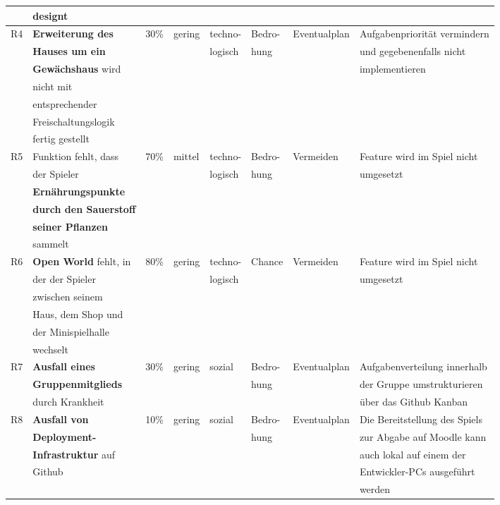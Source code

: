 \begin{table}[H]
\begin{tabular}{|c|l|l|l|l|l|l|l|}
        & designt &  &  &  &  &&  \\
        \hline
        R4 & \textbf{Erweiterung des} & 30\% & gering & techno- & Bedro- & Eventualplan & Aufgabenpriorität vermindern \\
        & \textbf{Hauses um ein} &  &  & logisch & hung&  & und gegebenenfalls nicht \\
        & \textbf{Gewächshaus} wird &  &  & & &  & implementieren \\
        & nicht mit &  &  &  &  & & \\
        & entsprechender &  &  &  &&  &  \\
        & Freischaltungslogik &  &  &&  &  &  \\
        & fertig gestellt &  &  &  & & &  \\
        \hline
        R5 & Funktion fehlt, dass & 70\% & mittel & techno- & Bedro- & Vermeiden & Feature wird im Spiel nicht \\
        & der Spieler &  &  & logisch &hung  &  &umgesetzt \\
        & \textbf{Ernährungspunkte} &&  &  &  &  &  \\
        & \textbf{durch den Sauerstoff} &&  &  &  &  &  \\
        & \textbf{seiner Pflanzen} &  &  &&  &  &  \\
        & sammelt &  &  &  &  &  &\\
        \hline
        R6 & \textbf{Open World} fehlt, in & 80\% & gering & techno- & Chance & Vermeiden &  Feature wird im Spiel nicht \\
        & der der Spieler &  &  & logisch& &  & umgesetzt \\
        & zwischen seinem &  &  &  &&  &  \\
        & Haus, dem Shop und &  &  &&  &  &  \\
        & der Minispielhalle &  &  & & &  &  \\
        & wechselt &  &  &  &  & & \\
        \hline
        R7 & \textbf{Ausfall eines} & 30\% & gering & sozial & Bedro- & Eventualplan & Aufgabenverteilung innerhalb \\
        & \textbf{Gruppenmitglieds} & & &  & hung &  & der Gruppe umstrukturieren \\
        & durch Krankheit &  &  &  & & & über das Github Kanban \\
        \hline
        R8 & \textbf{Ausfall von} & 10\% & gering & sozial & Bedro- & Eventualplan & Die Bereitstellung des Spiels \\
        & \textbf{Deployment-} &  &  && hung &  & zur Abgabe auf Moodle kann \\
        & \textbf{Infrastruktur} auf & & &  &  &  & auch lokal auf einem der \\
        & Github &  &  &  & & & Entwickler-PCs ausgeführt \\
        &  &  &  &  & & & werden \\
        \hline
    \end{tabular}
\end{table}

